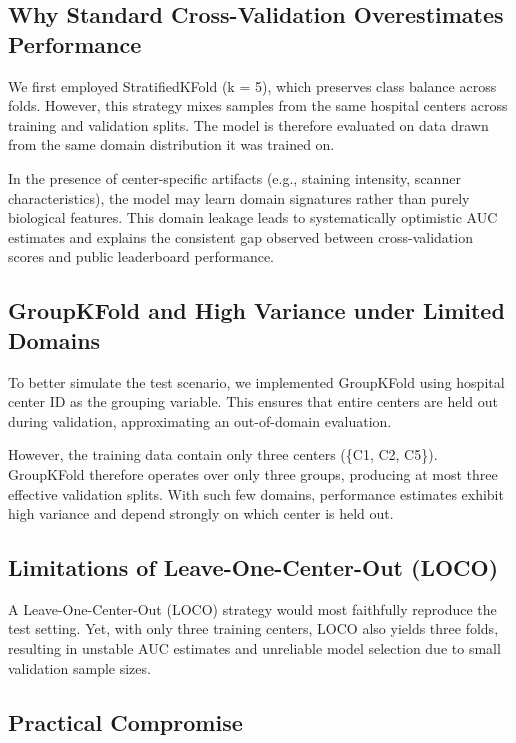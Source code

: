 \documentclass[11pt,a4paper]{article}
\begin{document}
\subsection{Why Standard Cross-Validation Overestimates Performance}

We first employed StratifiedKFold (k = 5), which preserves class balance across folds. 
However, this strategy mixes samples from the same hospital centers across training and validation splits. 
The model is therefore evaluated on data drawn from the same domain distribution it was trained on.

In the presence of center-specific artifacts (e.g., staining intensity, scanner characteristics), the model may learn domain signatures rather than purely biological features. 
This domain leakage leads to systematically optimistic AUC estimates and explains the consistent gap observed between cross-validation scores and public leaderboard performance.

\subsection{GroupKFold and High Variance under Limited Domains}

To better simulate the test scenario, we implemented GroupKFold using hospital center ID as the grouping variable. 
This ensures that entire centers are held out during validation, approximating an out-of-domain evaluation.

However, the training data contain only three centers (\{C1, C2, C5\}). 
GroupKFold therefore operates over only three groups, producing at most three effective validation splits. 
With such few domains, performance estimates exhibit high variance and depend strongly on which center is held out.

\subsection{Limitations of Leave-One-Center-Out (LOCO)}

A Leave-One-Center-Out (LOCO) strategy would most faithfully reproduce the test setting. 
Yet, with only three training centers, LOCO also yields three folds, resulting in unstable AUC estimates and unreliable model selection due to small validation sample sizes.

\subsection{Practical Compromise}
\end{document}
